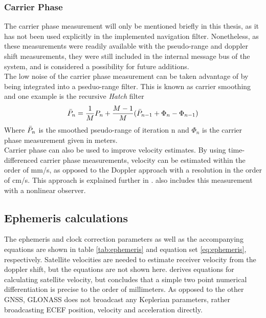 \subsubsection{Carrier Phase}
The carrier phase measurement will only be mentioned briefly in this thesis, as it has not been used explicitly in the implemented navigation filter. Nonetheless, as these measurements were readily available with the pseudo-range and doppler shift measurements, they were still included in the internal message bus of the system, and is considered a possibility for future additions.\\

The low noise of the carrier phase measurement can be taken advantage of by being integrated into a pseduo-range filter. This is known as carrier smoothing and one example is the recursive \textit{Hatch} filter \cite{misra2006global}
\begin{equation}
    \Bar{P}_n = \frac{1}{M}P_n + \frac{M-1}{M}(\Bar{P}_{n-1} + \Phi_n - \Phi_{n-1})
\end{equation}
Where $\Bar{P}_n$ is the smoothed pseudo-range of iteration n and $\Phi_n$ is the carrier phase measurement given in meters.\\

Carrier phase can also be used to improve velocity estimates. By using time-differenced carrier phase measurements, velocity can be estimated within the order of mm/s, as opposed to the Doppler approach with a resolution in the order of cm/s. This approach is explained further in \cite{freda2015time}. \cite{hansen2018nonlinear} also includes this measurement with a nonlinear observer.


\subsection{Ephemeris calculations}
\label{sec:ephemeris}
The ephemeris and clock correction parameters as well as the accompanying equations are shown in table \ref{tab:ephemeris} and equation set \ref{eq:ephemeris}, respectively. Satellite velocities are needed to estimate receiver velocity from the doppler shift, but the equations are not shown here. \cite{zhang2006gps} derives equations for calculating satellite velocity, but concludes that a simple two point numerical differentiation is precise to the order of millimeters. As opposed to the other GNSS, GLONASS does not broadcast any Keplerian parameters, rather broadcasting ECEF position, velocity and acceleration directly. \cite{groves2013principles}\\

